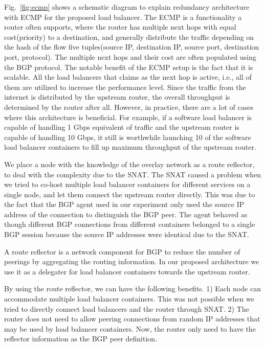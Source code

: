 Fig.~\ref{fig:ecmp} shows a schematic diagram to explain redundancy architecture with ECMP for the proposed load balancer.
%
The ECMP is a functionality a router often supports, where the router has multiple next hops with equal cost(priority) to a destination, and generally distribute the traffic depending on the hash of the flow five tuples(source IP, destination IP, source port, destination port, protocol).
The multiple next hops and their cost are often populated using the BGP protocol.
%
The notable benefit of the ECMP setup is the fact that it is scalable.
All the load balancers that claims as the next hop is active, i.e., all of them are utilized to increase the performance level.
Since the traffic from the internet is distributed by the upstream router, the overall throughput is determined by the router after all.
However, in practice, there are a lot of cases where this architecture is beneficial.
For example, if a software load balancer is capable of handling 1 Gbps equivalent of traffic and the upstream router is capable of handling 10 Gbps, it still is worthwhile launching 10 of the software load balancer containers to fill up maximum throughput of the upstream router.

%
We place a node with the knowledge of the overlay network as a route reflector, to deal with the complexity due to the SNAT.
The SNAT caused a problem when we tried to co-host multiple load balancer containers for different services on a single node, and let them connect the upstream router directly.
This was due to the fact that the BGP agent used in our experiment only used the source IP address of the connection to distinguish the BGP peer.
The agent behaved as though different BGP connections from different containers belonged to a single BGP session because the source IP addresses were identical due to the SNAT.

A route reflector is a network component for BGP to reduce the number of peerings by aggregating the routing information\cite{rfc4456}.
In our proposed architecture we use it as a delegater for load balancer containers towards the upstream router.

By using the route reflector, we can have the following benefits.
1) Each node can accommodate multiple load balancer containers. This was not possible when we tried to directly connect load balancers and the router through SNAT.
2) The router does not need to allow peering connections from random IP addresses that may be used by load balancer containers. Now, the router only need to have the reflector information as the BGP peer definition.

